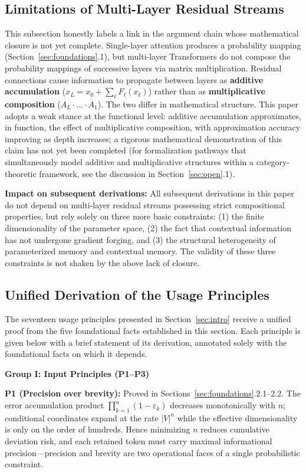 \documentclass[11pt,a4paper]{article}
\theoremstyle{definition}
\begin{document}
\subsection{Limitations of Multi-Layer Residual Streams}

This subsection honestly labels a link in the argument chain whose mathematical closure is not yet complete. Single-layer attention produces a probability mapping (Section~\ref{sec:foundations}.1), but multi-layer Transformers do not compose the probability mappings of successive layers via matrix multiplication. Residual connections cause information to propagate between layers as \textbf{additive accumulation} ($x_L = x_0 + \sum_{\ell} F_\ell(x_\ell)$) rather than as \textbf{multiplicative composition} ($A_L \cdot ... \cdot A_1$). The two differ in mathematical structure. This paper adopts a weak stance at the functional level: additive accumulation approximates, in function, the effect of multiplicative composition, with approximation accuracy improving as depth increases; a rigorous mathematical demonstration of this claim has not yet been completed (for formalization pathways that simultaneously model additive and multiplicative structures within a category-theoretic framework, see the discussion in Section~\ref{sec:open}.1).

\textbf{Impact on subsequent derivations:} All subsequent derivations in this paper do not depend on multi-layer residual streams possessing strict compositional properties, but rely solely on three more basic constraints: (1) the finite dimensionality of the parameter space, (2) the fact that contextual information has not undergone gradient forging, and (3) the structural heterogeneity of parameterized memory and contextual memory. The validity of these three constraints is not shaken by the above lack of closure.

\subsection{Unified Derivation of the Usage Principles}

The seventeen usage principles presented in Section~\ref{sec:intro} receive a unified proof from the five foundational facts established in this section. Each principle is given below with a brief statement of its derivation, annotated solely with the foundational facts on which it depends.

\medskip
\textbf{Group I: Input Principles (P1--P3)}

\textbf{P1 (Precision over brevity):} Proved in Sections~\ref{sec:foundations}.2.1--2.2. The error accumulation product $\prod_{k=1}^n (1-\varepsilon_k)$ decreases monotonically with $n$; conditional coordinates expand at the rate $|V|^n$ while the effective dimensionality is only on the order of hundreds. Hence minimizing $n$ reduces cumulative deviation risk, and each retained token must carry maximal informational precision---precision and brevity are two operational faces of a single probabilistic constraint.
\end{document}
